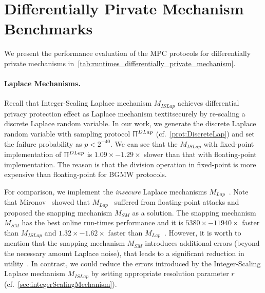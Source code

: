 \section{Differentially Pirvate Mechanism Benchmarks}
\label{DifferentiallyPirvateMechanismBenchmarks}

We present the performance evaluation of the MPC protocols for differentially private mechanisms in~\autoref{tab:runtimes_differentially_private_mechanism}.

\paragraph{Laplace Mechanisms.}
Recall that Integer-Scaling Laplace mechanism $M_{ISLap} $ achieves differential privacy protection effect as Laplace mechanism textit{securely} by re-scaling a discrete Laplace random variable.
In our work, we generate the discrete Laplace random variable with sampling protocol $\Uppi^{DLap}$ (cf.~\autoref{prot:DiscreteLap}) and set the failure probability as $p<2^{-40}$.
We can see that the $M_{ISLap}$ with fixed-point implementation of $\Uppi^{DLap}$ is $1.09\times-1.29\times$ slower than that with floating-point implementation.
The reason is that the division operation in fixed-point is more expensive than floating-point for BGMW protocols.

For comparison, we implement the \textit{insecure} Laplace mechanisms $M_{Lap}$~\cite{eigner2014differentially}.
Note that Mironov~\cite{mironov2012significance} showed that $M_{Lap}$~\cite{eigner2014differentially} suffered from floating-point attacks and proposed the snapping mechanism $M_{SM}$ as a solution.
The snapping mechanism $M_{SM}$ has the best online run-times performance and it is $5380\times-11940\times $ faster than $M_{ISLap}$ and $1.32\times- 1.62\times$ faster than $M_{Lap}$~\cite{eigner2014differentially}.
However, it is worth to mention that the snapping mechanism $M_{SM}$ introduces additional errors (beyond the necessary amount Laplace noise), that leads to a significant reduction in utility~\cite{Covington2019,googleDP2019}.
In contrast, we could reduce the errors introduced by the Integer-Scaling Laplace mechanism $M_{ISLap}$ by setting appropriate resolution parameter $r$ (cf.~\autoref{sec:integerScalingMechanism}).






